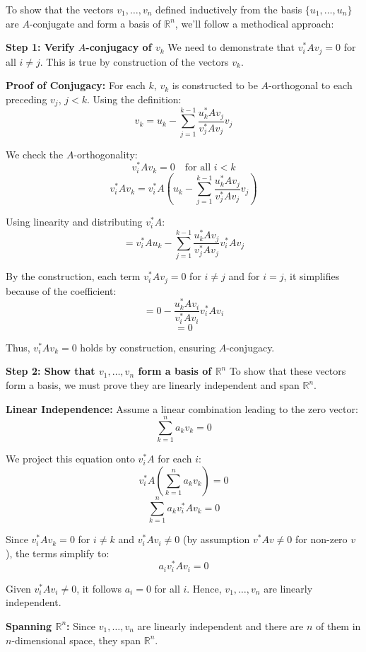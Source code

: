 \documentclass[8pt]{article}
\begin{document}
To show that the vectors \(v_1, \ldots, v_n\) defined inductively from the basis \(\{u_1, \ldots, u_n\}\) are \(A\)-conjugate and form a basis of \(\mathbb{R}^n\), we'll follow a methodical approach:

\textbf{Step 1: Verify \(A\)-conjugacy of \(v_k\)}
We need to demonstrate that \(v_i^* A v_j = 0\) for all \(i \neq j\). This is true by construction of the vectors \(v_k\). 

\textbf{Proof of Conjugacy:}
For each \(k\), \(v_k\) is constructed to be \(A\)-orthogonal to each preceding \(v_j\), \(j < k\). Using the definition:
\[ v_k = u_k - \sum_{j=1}^{k-1} \frac{u_k^* A v_j}{v_j^* A v_j} v_j \]

We check the \(A\)-orthogonality:
\[ v_i^* A v_k = 0 \quad \text{for all } i < k \]
\[ v_i^* A v_k = v_i^* A \left( u_k - \sum_{j=1}^{k-1} \frac{u_k^* A v_j}{v_j^* A v_j} v_j \right) \]

Using linearity and distributing \(v_i^* A\):
\[ = v_i^* A u_k - \sum_{j=1}^{k-1} \frac{u_k^* A v_j}{v_j^* A v_j} v_i^* A v_j \]

By the construction, each term \(v_i^* A v_j = 0\) for \(i \neq j\) and for \(i = j\), it simplifies because of the coefficient:
\[ = 0 - \frac{u_k^* A v_i}{v_i^* A v_i} v_i^* A v_i \]
\[ = 0 \]

Thus, \(v_i^* A v_k = 0\) holds by construction, ensuring \(A\)-conjugacy.

\textbf{Step 2: Show that \(v_1, \ldots, v_n\) form a basis of \(\mathbb{R}^n\)}
To show that these vectors form a basis, we must prove they are linearly independent and span \(\mathbb{R}^n\).

\textbf{Linear Independence:}
Assume a linear combination leading to the zero vector:
\[ \sum_{k=1}^n a_k v_k = 0 \]

We project this equation onto \(v_i^* A\) for each \(i\):
\[ v_i^* A \left(\sum_{k=1}^n a_k v_k\right) = 0 \]
\[ \sum_{k=1}^n a_k v_i^* A v_k = 0 \]

Since \(v_i^* A v_k = 0\) for \(i \neq k\) and \(v_i^* A v_i \neq 0\) (by assumption \(v^* A v \neq 0\) for non-zero \(v\)), the terms simplify to:
\[ a_i v_i^* A v_i = 0 \]

Given \(v_i^* A v_i \neq 0\), it follows \(a_i = 0\) for all \(i\). Hence, \(v_1, \ldots, v_n\) are linearly independent.

\textbf{Spanning \(\mathbb{R}^n\):}
Since \(v_1, \ldots, v_n\) are linearly independent and there are \(n\) of them in \(n\)-dimensional space, they span \(\mathbb{R}^n\).
\end{document}
